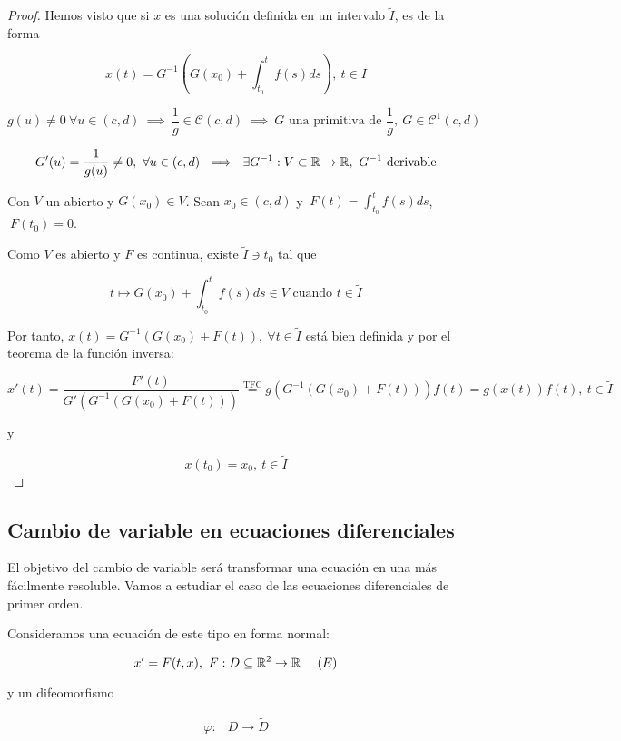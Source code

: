 

\begin{proof}

Hemos visto que si $x$ es una solución definida en un intervalo $\tilde{I}$, es de la forma

\[
x(t) = G^{-1}\left(G(x_0) + \int_{t_0}^t f(s)ds\right),\ t\in I
\]  
  
\[g(u) \neq 0 \ \forall u \in (c,d) \ \implies \ \frac{1}{g} \in \mathscr{C}(c,d) \ \implies \ G \text{ una primitiva de } \frac{1}{g}, \ G\in \mathscr{C}^{1}(c,d)\]

\[G'(u) = \frac{1}{g(u)} \neq 0, \ \forall u \in (c,d) \ \implies \ \exists G^{-1}:V\subset \mathbb{R} \to \mathbb{R}, \ G^{-1} \text{ derivable}\]

Con $V$ un abierto y $G(x_0) \in V$.
Sean $x_0 \in (c,d)$ y $\ F(t) = \displaystyle\int_{t_0}^t f(s) ds$, $\ F(t_0) = 0$.

Como $V$ es abierto y $F$ es continua, existe $\tilde{I} \ni t_0$ tal que

\[t \mapsto G(x_0)+\int_{t_0}^t f(s) ds  \in V \text{ cuando } t\in \tilde{I}\]

Por tanto, $x(t) = G^{-1}\left(G(x_0) + F(t)\right), \ \forall t \in \tilde{I}$ está bien definida y por el teorema de la función inversa:

\[x'(t) = \frac{F'(t)}{G'(G^{-1}(G(x_0) + F(t)))} \stackrel{\text{TFC}}{=} g\left(G^{-1}\left(G(x_0) + F(t)\right)\right)f(t) = g(x(t))f(t),\ t\in \tilde{I}\]

y

\[x(t_0) = x_0,\ t\in \tilde{I}\]


\end{proof}

  
\subsection{Cambio de variable en ecuaciones diferenciales}
El objetivo del cambio de variable será transformar una ecuación en una más fácilmente resoluble.
Vamos a estudiar el caso de las ecuaciones diferenciales de primer orden.


Consideramos una ecuación de este tipo en forma normal:

\[
  x' = F(t, x),\ F : D \subseteq \mathbb{R}^2 \to \mathbb{R} \ \ \ \ (E)
  \]

  y un difeomorfismo

  \[
  \begin{array}{lll}
    \varphi : & D \to \widetilde{D} \\ 
  \end{array}
  \]

